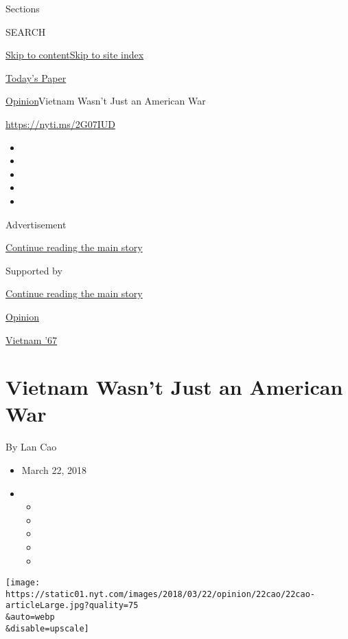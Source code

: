 Sections

SEARCH

\protect\hyperlink{site-content}{Skip to
content}\protect\hyperlink{site-index}{Skip to site index}

\href{https://myaccount.nytimes.com/auth/login?response_type=cookie\&client_id=vi}{}

\href{https://www.nytimes.com/section/todayspaper}{Today's Paper}

\href{/section/opinion}{Opinion}\textbar{}Vietnam Wasn't Just an
American War

\href{https://nyti.ms/2G07IUD}{https://nyti.ms/2G07IUD}

\begin{itemize}
\item
\item
\item
\item
\item
\end{itemize}

Advertisement

\protect\hyperlink{after-top}{Continue reading the main story}

Supported by

\protect\hyperlink{after-sponsor}{Continue reading the main story}

\href{/section/opinion}{Opinion}

\href{/column/vietnam-67}{Vietnam '67}

\hypertarget{vietnam-wasnt-just-an-american-war}{%
\section{Vietnam Wasn't Just an American
War}\label{vietnam-wasnt-just-an-american-war}}

By Lan Cao

\begin{itemize}
\item
  March 22, 2018
\item
  \begin{itemize}
  \item
  \item
  \item
  \item
  \item
  \end{itemize}
\end{itemize}

\texttt{[image: https://static01.nyt.com/images/2018/03/22/opinion/22cao/22cao-articleLarge.jpg?quality=75\\\&auto=webp\\\&disable=upscale]}

